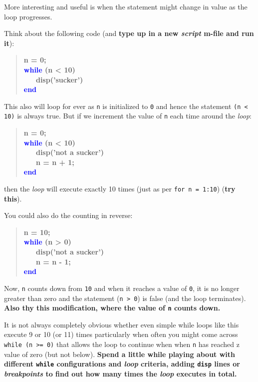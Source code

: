 \documentclass{tufte-book} %
\newenvironment{docspecbold}{\begin{quotation}\ttfamily\bfseries\parskip0pt\parindent0pt\ignorespaces}{\end{quotation}}
\begin{document}
More interesting and useful is when the statement might change in value as the loop progresses.

Think about the following code (and \textbf{type up in a new \textit{script} m-file and run it}):

\begin{docspecbold}
n = 0;
\\\textcolor{blue}{while} (n < 10)
\\ \ \ \ disp('sucker')
\\\textcolor{blue}{end}
\end{docspecbold}

This also will loop for ever as \texttt{n} is initialized to \texttt{0} and hence the statement \texttt{(n < 10)} is always true. But if we increment the value of \texttt{n} each time around the \textit{loop}: 

\begin{docspecbold}
n = 0;
\\\textcolor{blue}{while} (n < 10)
\\ \ \ \ disp('not a sucker')
\\ \ \ \ n = n + 1;
\\\textcolor{blue}{end}
\end{docspecbold}

\noindent then the \textit{loop} will execute exactly 10 times (just as per \texttt{for n = 1:10}) (\textbf{try this}).

You could also do the counting in reverse: 

\begin{docspecbold}
n = 10;
\\\textcolor{blue}{while} (n > 0)
\\ \ \ \ disp('not a sucker')
\\ \ \ \ n = n - 1;
\\\textcolor{blue}{end}
\end{docspecbold}

Now, \texttt{n} counts down from \texttt{10} and when it reaches a value of \texttt{0}, it is no longer greater than zero and the statement (\texttt{n > 0}) is false (and the loop terminates). \textbf{Also thy this modification, where the value of \texttt{n} counts down.}

It is not always completely obvious whether even simple while loops like this execute 9 or 10 (or 11) times particularly when often you might come across \texttt{while (n >= 0)} that allows the loop to continue when when \texttt{n} has reached z value of zero (but not below). \textbf{Spend a little while playing about with different \texttt{while} configurations and \textit{loop} criteria, adding \texttt{disp} lines or \textit{breakpoints} to find out how many times the \textit{loop} executes in total.}
\end{document}

